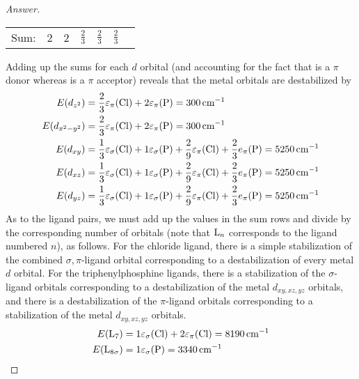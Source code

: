 \documentclass[../psets.tex]{subfiles}
\begin{document}
\begin{enumerate}[label={\Roman*)}]
\begin{enumerate}[label={\textbf{10.\arabic*}}]
\begin{proof}[Answer]
\begin{center}
\begin{tabular}{c|cccccc}
                    \hline
                    Sum: & 2 & 2 & $\frac{2}{3}$ & $\frac{2}{3}$ & $\frac{2}{3}$\\
                \end{tabular}
            \end{center}
            Adding up the sums for each $d$ orbital (and accounting for the fact that  is a $\pi$ donor whereas  is a $\pi$ acceptor) reveals that the metal orbitals are destabilized by
            \begingroup
            \allowdisplaybreaks
            \begin{align*}
                E(d_{z^2}) &= \frac{2}{3}\varepsilon_\pi(\ce{Cl})+2\varepsilon_\pi(\ce{P}) = \SI{300}{\per\centi\meter}\\
                E(d_{x^2-y^2}) &= \frac{2}{3}\varepsilon_\pi(\ce{Cl})+2\varepsilon_\pi(\ce{P}) = \SI{300}{\per\centi\meter}\\
                E(d_{xy}) &= \frac{1}{3}\varepsilon_\sigma(\ce{Cl})+1\varepsilon_\sigma(\ce{P})+\frac{2}{9}\varepsilon_\pi(\ce{Cl})+\frac{2}{3}e_\pi(\ce{P}) = \SI{5250}{\per\centi\meter}\\
                E(d_{xz}) &= \frac{1}{3}\varepsilon_\sigma(\ce{Cl})+1\varepsilon_\sigma(\ce{P})+\frac{2}{9}\varepsilon_\pi(\ce{Cl})+\frac{2}{3}e_\pi(\ce{P}) = \SI{5250}{\per\centi\meter}\\
                E(d_{yz}) &= \frac{1}{3}\varepsilon_\sigma(\ce{Cl})+1\varepsilon_\sigma(\ce{P})+\frac{2}{9}\varepsilon_\pi(\ce{Cl})+\frac{2}{3}e_\pi(\ce{P}) = \SI{5250}{\per\centi\meter}
            \end{align*}
            \endgroup
            As to the ligand pairs, we must add up the values in the sum rows and divide by the corresponding number of orbitals (note that $\ce{L}_n$ corresponds to the ligand numbered $n$), as follows. For the chloride ligand, there is a simple stabilization of the combined $\sigma,\pi$-ligand orbital corresponding to a destabilization of every metal $d$ orbital. For the triphenylphosphine ligands, there is a stabilization of the $\sigma$-ligand orbitals corresponding to a destabilization of the metal $d_{xy,xz,yz}$ orbitals, and there is a destabilization of the $\pi$-ligand orbitals corresponding to a stabilization of the metal $d_{xy,xz,yz}$ orbitals.
            \begin{align*}
                E(\ce{L}_7) &= 1\varepsilon_\sigma(\ce{Cl})+2\varepsilon_\pi(\ce{Cl}) = \SI{8190}{\per\centi\meter}\\
                E(\ce{L}_{8\sigma}) &= 1\varepsilon_\sigma(\ce{P}) = \SI{3340}{\per\centi\meter}\\

\end{align*}
\end{proof}
\end{enumerate}
\end{enumerate}
\end{document}

